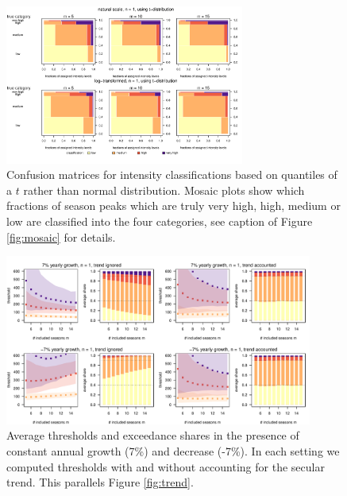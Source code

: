 \documentclass[12pt]{article}
\begin{document}
\begin{figure}[h!]
\begin{center}
\includegraphics[width=0.7\textwidth]{figure/mosaic_t_fr.pdf}

\caption{Confusion matrices for intensity classifications based on quantiles of a $t$ rather than normal distribution. Mosaic plots show which fractions of season peaks which are truly very high, high, medium or low are classified into the four categories, see caption of Figure \ref{fig:mosaic} for details.}
\label{fig:mosaic_t}
\end{center}
\end{figure}


\newpage

\begin{figure}[h!]
\begin{center}
\includegraphics[width = 0.9\textwidth]{figure/plot_trend7_fr_small.pdf}
\end{center}
\caption{Average thresholds and exceedance shares in the presence of constant annual growth (7\%) and decrease (-7\%). In each setting we computed thresholds with and without accounting for the secular trend. This parallels Figure \ref{fig:trend}.}
\label{fig:trend7}
\end{figure}
\end{document}
